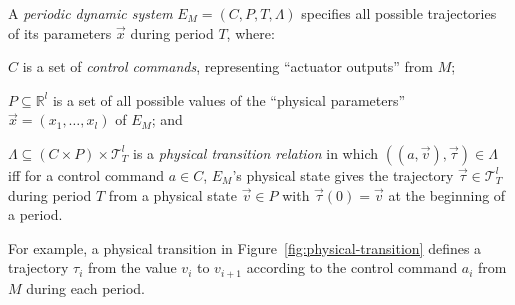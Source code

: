 \documentclass{sig-alternate}
\begin{document}
A \emph{periodic dynamic system} $E_M = (C, P, T, \Lambda)$ 
specifies all possible trajectories of its parameters $\vec{x}$
during period $T$, %
where:
 \begin{inparaenum}[(i)]
	\item $C$ is a set of \emph{control commands}, representing
          ``actuator outputs'' from %
          $M$;
	\item $P \subseteq \mathbb{R}^l$ is a set of all possible values 
          of the ``physical 
          parameters'' $\vec{x} = (x_1, \ldots, x_l)$ 
          of  $E_M$; and
	\item $\Lambda \subseteq (C \times P) \times \mathcal{T}_{T}^l$
	is a \emph{physical transition relation} in which
	$((a, \vec{v}),  \vec{\tau}) \in \Lambda$
	 iff for a control command $a \in C$, %
	$E_M$'s physical state gives the trajectory 
	$\vec{\tau} \in \mathcal{T}_{T}^l$ during period $T$
	from a physical state $\vec{v} \in P$
	with $\vec{\tau}(0) = \vec{v}$ at the beginning of a period.
\end{inparaenum}
%
For example,
a physical transition in Figure~\ref{fig:physical-transition} 
defines a trajectory $\tau_i$
from the value $v_i$ to $v_{i+1}$
 according to the control command $a_i$ 
from $M$ during each period.
\end{document}
